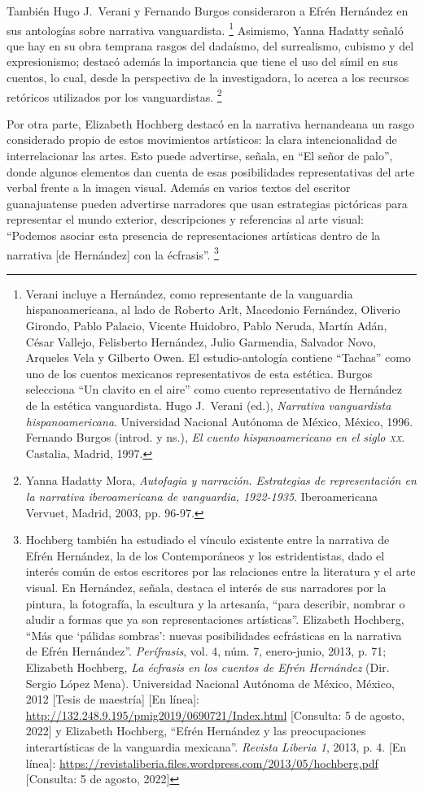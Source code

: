 \documentclass[14pt,twoside,final]{extbook} %
\let\oldfootnote\footnote
\renewcommand\footnote[1]{%
\oldfootnote{\hspace{1mm}#1}}
\begin{document}
También Hugo J.~Verani y Fernando Burgos consideraron a Efrén Hernández en sus antologías sobre narrativa vanguardista.\footnote{Verani incluye a Hernández, como representante de la vanguardia hispanoamericana, al lado de Roberto Arlt, Macedonio Fernández, Oliverio Girondo, Pablo Palacio, Vicente Huidobro, Pablo Neruda, Martín Adán, César Vallejo, Felisberto Hernández, Julio Garmendia, Salvador Novo, Arqueles Vela y Gilberto Owen. El estudio-antología contiene ``Tachas'' como uno de los cuentos mexicanos representativos de esta estética. Burgos selecciona ``Un clavito en el aire'' como cuento representativo de Hernández de la estética vanguardista. Hugo J.~Verani (ed.), \emph{Narrativa vanguardista hispanoamericana}. Universidad Nacional Autónoma de México, México, 1996. Fernando Burgos (introd. y ns.), \emph{El cuento hispanoamericano en el
siglo \textsc{xx}}. Castalia, Madrid, 1997.} Asimismo, Yanna Hadatty señaló que hay en su obra temprana rasgos del dadaísmo, del surrealismo, cubismo y del expresionismo; destacó además la importancia que tiene el uso del símil en sus cuentos, lo cual, desde la perspectiva de la investigadora, lo acerca a los recursos retóricos utilizados por los vanguardistas.\footnote{Yanna Hadatty Mora, \emph{Autofagia y narración. Estrategias de representación en la narrativa iberoamericana de vanguardia, 1922-1935}. Iberoamericana Vervuet, Madrid, 2003, pp. 96-97.}

Por otra parte, Elizabeth Hochberg destacó en la narrativa hernandeana un rasgo considerado propio de estos movimientos artísticos: la clara intencionalidad de interrelacionar las artes. Esto puede advertirse, señala, en ``El señor de palo'', donde algunos elementos dan cuenta de esas posibilidades representativas del arte verbal frente a la imagen visual. Además en varios textos del escritor guanajuatense pueden advertirse narradores que usan estrategias pictóricas para representar el mundo exterior, descripciones y referencias al arte visual: ``Podemos asociar esta presencia de representaciones artísticas dentro de la narrativa [de Hernández] con la écfrasis''.\footnote{Hochberg también ha estudiado el vínculo existente entre la narrativa de Efrén Hernández, la de los Contemporáneos y los estridentistas, dado el interés común de estos escritores por las relaciones entre la literatura y el arte visual. En Hernández, señala, destaca el interés de sus narradores por la pintura, la fotografía, la escultura y la artesanía, ``para describir, nombrar o aludir a formas que ya son representaciones artísticas''. Elizabeth Hochberg, ``Más que `pálidas sombras': nuevas posibilidades ecfrásticas en la narrativa de Efrén Hernández''. \emph{Perífrasis}, vol. 4, núm. 7, enero-junio, 2013, p. 71; Elizabeth Hochberg, \emph{La écfrasis en los cuentos de Efrén Hernández} (Dir. Sergio López Mena). Universidad Nacional Autónoma de México, México, 2012 [Tesis de maestría] [En línea]: \url{http://132.248.9.195/pmig2019/0690721/Index.html} [Consulta: 5 de agosto, 2022] y Elizabeth Hochberg, ``Efrén Hernández y las preocupaciones interartísticas de la vanguardia mexicana''. \emph{Revista Liberia 1}, 2013, p. 4. [En línea]: \url{https://revistaliberia.files.wordpress.com/2013/05/hochberg.pdf} [Consulta: 5 de agosto, 2022]}
\end{document}
